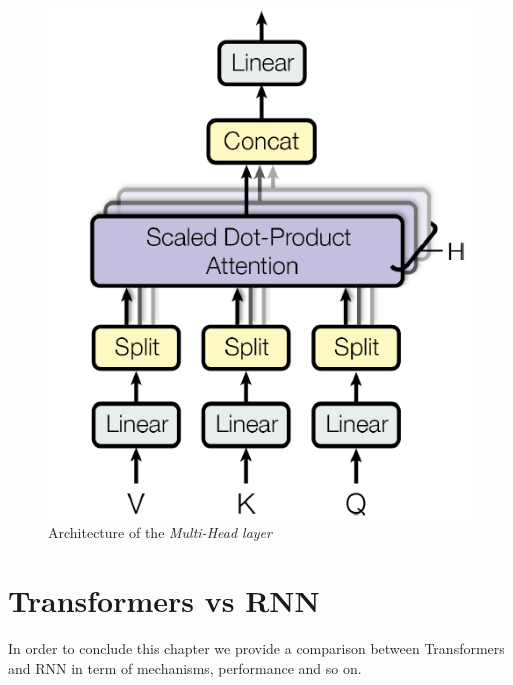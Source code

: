 \begin{figure}
    \centering
    \includegraphics[scale=0.7]{img/multi_head.png}
    \caption{Architecture of the \textit{Multi-Head layer}}
\end{figure}

\section{Transformers vs RNN}
In order to conclude this chapter we provide a comparison between Transformers and RNN in term of mechanisms, performance and so on. 

\renewcommand{\arraystretch}{1.5}
\setlength{\tabcolsep}{8pt}

